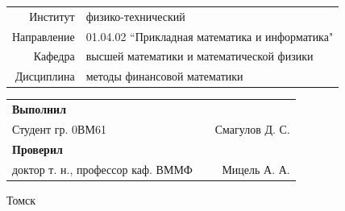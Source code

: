 \begin{titlepage}
\vspace{\fill}

\begin{center}
\begin{tabular}{rl}
    Институт & физико-технический \\
    Направление & 01.04.02 ``Прикладная математика и информатика" \\
    Кафедра & высшей математики и математической физики \\
    Дисциплина & методы финансовой математики \\
\end{tabular}
\end{center}


\begin{table}[h]
    \centering
    \begin{tabular}{lcr}
        \textbf{Выполнил} & & \\
        Студент гр. 0ВМ61 & \underline{\hspace{2.5cm}} & Смагулов Д. С. \\
        \textbf{Проверил} & & \\
        доктор т. н., профессор каф. ВММФ & \underline{\hspace{2.5cm}} & Мицель А. А. \\
    \end{tabular}
\end{table}

\vspace{0.5cm}

\begin{center}
Томск\\ \the\year
\end{center}

\end{titlepage}